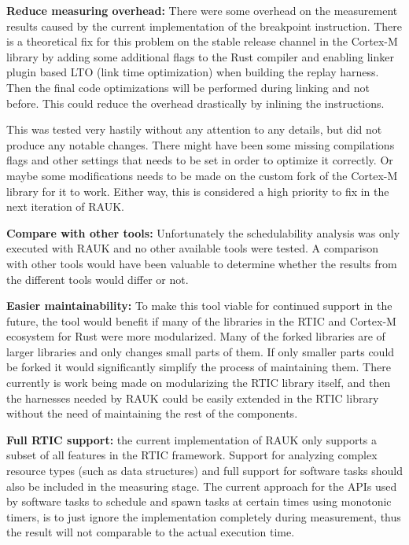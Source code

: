 \textbf{Reduce measuring overhead:} There were some overhead on the measurement
results caused by the current implementation of the breakpoint instruction.
There is a theoretical fix for this problem on the stable release channel in
the Cortex-M library by adding some additional flags to the Rust compiler and
enabling linker plugin based LTO (link time optimization) when building the
replay harness. Then the final code optimizations will be performed during
linking and not before. This could reduce the overhead drastically by inlining
the instructions. 

This was tested very hastily without any attention to any details, but did not
produce any notable changes. There might have been some missing compilations
flags and other settings that needs to be set in order to optimize it
correctly. Or maybe some modifications needs to be made on the custom fork of
the Cortex-M library for it to work. Either way, this is considered a high
priority to fix in the next iteration of RAUK\@.

\textbf{Compare with other tools:} Unfortunately the schedulability analysis
was only executed with RAUK and no other available tools were tested. A
comparison with other tools would have been valuable to determine whether the
results from the different tools would differ or not. 

\textbf{Easier maintainability:} To make this tool viable for continued support
in the future, the tool would benefit if many of the libraries in the RTIC and
Cortex-M ecosystem for Rust were more modularized. Many of the forked libraries
are of larger libraries and only changes small parts of them. If only smaller
parts could be forked it would significantly simplify the process of
maintaining them. There currently is work being made on modularizing the RTIC
library itself, and then the harnesses needed by RAUK could be easily extended
in the RTIC library without the need of maintaining the rest of the components.

\textbf{Full RTIC support:} the current implementation of RAUK only supports
a subset of all features in the RTIC framework. Support for analyzing complex
resource types (such as data structures) and full support for software tasks
should also be included in the measuring stage. The current approach for the APIs
used by software tasks to schedule and spawn tasks at certain times using
monotonic timers, is to just ignore the implementation completely during
measurement, thus the result will not comparable to the actual execution time.
